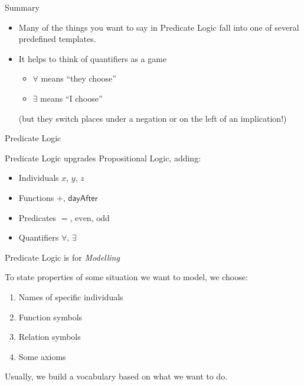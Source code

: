 \documentclass[xetex,aspectratio=169,14pt,hyperref={pdfpagelabels=true,pdflang={en-GB}}]{beamer}
\begin{document}
\begin{frame}
  {Summary}

  \begin{itemize}
  \item Many of the things you want to say in Predicate Logic fall
    into one of several predefined templates.
  \item It helps to think of quantifiers as a game
    \begin{itemize}
    \item $\forall$ means ``they choose''
    \item $\exists$ means ``I choose''
    \end{itemize}
    (but they switch places under a negation or on the left of an
    implication!)
  \end{itemize}
\end{frame}


\begin{frame}
  {Predicate Logic}

  Predicate Logic upgrades Propositional Logic, adding:
  \begin{itemize}
  \item Individuals $x$, $y$, $z$
  \item Functions $+$, $\mathsf{dayAfter}$
  \item Predicates $=$, $\mathrm{even}$, $\mathrm{odd}$
  \item Quantifiers $\forall$, $\exists$
  \end{itemize}
\end{frame}

\begin{frame}
  {Predicate Logic is for \emph{Modelling}}

  \bigskip

  To state properties of some situation we want to model, we choose:
  \begin{enumerate}
  \item Names of specific individuals \\
  \item Function symbols \\
  \item Relation symbols \\
  \item Some axioms \\
  \end{enumerate}

  \bigskip

  Usually, we build a vocabulary based on what we want to do.
\end{frame}
\end{document}
